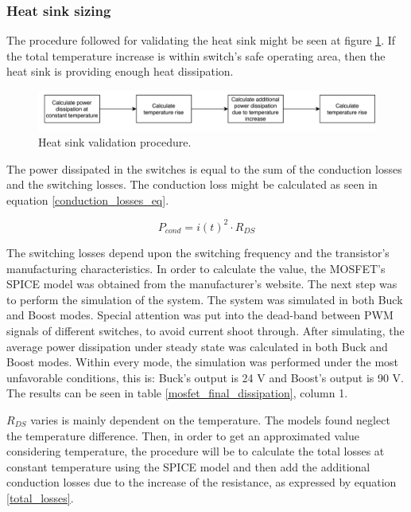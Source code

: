 \subsubsection{Heat sink sizing}

The procedure followed for validating the heat sink might be seen at figure \ref{heat_sink_validation_procedure}. If the total temperature increase is within switch's safe operating area, then the heat sink is providing enough heat dissipation.

\begin{figure}[htbp]
	\begin{center}
		\includegraphics[width=\textwidth]{../Pictures/P1/Component_sizing/heat_sink_validation_procedure.png}
		\caption{Heat sink validation procedure.}
		\label{heat_sink_validation_procedure}
	\end{center}	
\end{figure}

The power dissipated in the switches is equal to the sum of the conduction losses and the switching losses. The conduction loss might be calculated  as seen in equation \ref{conduction_losses_eq}.

\begin{equation} \label{conduction_losses_eq}
P_{cond} = i(t)^2 \cdot R_{DS}
\end{equation}

The switching losses depend upon the switching frequency and the transistor's manufacturing characteristics. In order to calculate the value, the MOSFET's SPICE model was obtained from the manufacturer's website. The next step was to perform the simulation of the system. The system was simulated in both Buck and Boost modes. Special attention was put into the dead-band between PWM signals of different switches, to avoid current shoot through. After simulating, the average power dissipation under steady state was calculated in both Buck and Boost modes. Within every mode, the simulation was performed under the most unfavorable conditions, this is: Buck's output is 24 V and Boost's output is 90 V. The results can be seen in table \ref{mosfet_final_dissipation}, column 1.

$R_{DS}$ varies  is mainly dependent on the temperature. The models found neglect the temperature difference. Then, in order to get an approximated value considering temperature, the procedure will be to calculate the total losses at constant temperature using the SPICE model and then add the additional conduction losses due to the increase of the resistance, as expressed by equation \ref{total_losses}.


